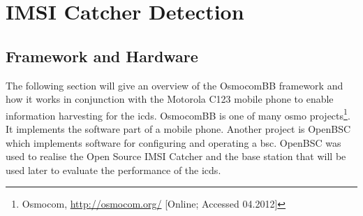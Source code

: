 \chapter{IMSI Catcher Detection}
\section{Framework and Hardware}
The following section will give an overview of the OsmocomBB framework and how it works in conjunction with the Motorola C123 mobile phone to enable information harvesting for the \gls{icds}.
OsmocomBB is one of many \gls{osmo} projects\footnote{Osmocom, \url{http://osmocom.org/} [Online; Accessed 04.2012]}. It implements the software part of a mobile phone.
Another project is OpenBSC which implements software for configuring and operating a \gls{bsc}.
OpenBSC was used to realise the Open Source IMSI Catcher \cite{dennis} and the base station that will be used later to evaluate the performance of the \gls{icds}.

